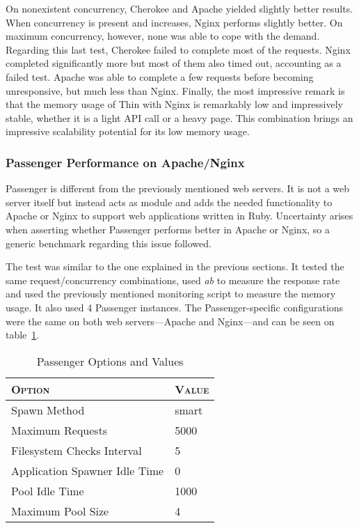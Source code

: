 On nonexistent concurrency, Cherokee and Apache yielded slightly better results. When concurrency is present and increases, Nginx performs slightly better. On maximum concurrency, however, none was able to cope with the demand. Regarding this last test, Cherokee failed to complete most of the requests. Nginx completed significantly more but most of them also timed out, accounting as a failed test. Apache was able to complete a few requests before becoming unresponsive, but much less than Nginx. Finally, the most impressive remark is that the memory usage of Thin with Nginx is remarkably low and impressively stable, whether it is a light API call or a heavy page. This combination brings an impressive scalability potential for its low memory usage.

\subsubsection{Passenger Performance on Apache/Nginx}
Passenger is different from the previously mentioned web servers. It is not a web server itself but instead acts as module and adds the needed functionality to Apache or Nginx to support web applications written in Ruby. Uncertainty arises when asserting whether Passenger performs better in Apache or Nginx, so a generic benchmark regarding this issue followed.

The test was similar to the one explained in the previous sections. It tested the same request/concurrency combinations, used \textit{ab} to measure the response rate and used the previously mentioned monitoring script to measure the memory usage. It also used 4 Passenger instances. The Passenger-specific configurations were the same on both web servers---Apache and Nginx---and can be seen on table~\ref{tab:passenger4_configuration}.
\begin{table}[h!t]
  \centering
  \caption{Passenger Options and Values}
  \label{tab:passenger4_configuration}
  
  \begin{tabular}{p{}|p{}}
  
    \textsc{\textbf{Option}} & \textsc{\textbf{Value}} \\ \hline
    Spawn Method & smart \\ \hline
    Maximum Requests & 5000 \\ \hline
    Filesystem Checks Interval & 5 \\ \hline
    Application Spawner Idle Time & 0 \\ \hline
    Pool Idle Time & 1000 \\ \hline
    Maximum Pool Size & 4 \\
  
  \end{tabular}
\end{table}

